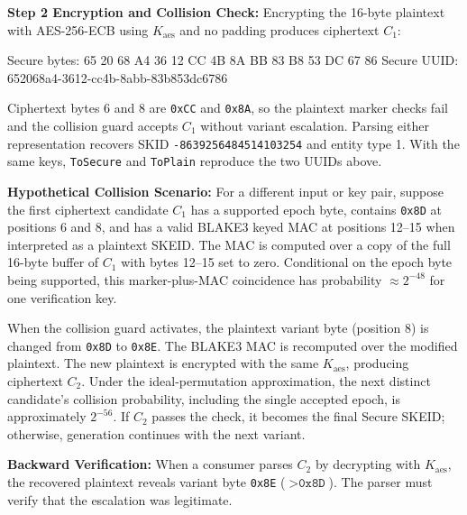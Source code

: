 \documentclass[fleqn,10pt]{wlpeerj}
\newenvironment{Shaded}{}{}
\newcommand{\NormalTok}[1]{#1}
\begin{document}
\textbf{Step 2 Encryption and Collision Check:} Encrypting the 16-byte
plaintext with AES-256-ECB using \(K_{\mathrm{aes}}\) and no padding
produces ciphertext \(C_1\):

\begin{Shaded}
\begin{Highlighting}[]
\NormalTok{Secure bytes: 65 20 68 A4 36 12 CC 4B 8A BB 83 B8 53 DC 67 86}
\NormalTok{Secure UUID:  652068a4{-}3612{-}cc4b{-}8abb{-}83b853dc6786}
\end{Highlighting}
\end{Shaded}

Ciphertext bytes 6 and 8 are \texttt{0xCC} and \texttt{0x8A}, so the
plaintext marker checks fail and the collision guard accepts \(C_1\)
without variant escalation. Parsing either representation recovers SKID
\texttt{-8639256484514103254} and entity type 1. With the same keys,
\texttt{ToSecure} and \texttt{ToPlain} reproduce the two UUIDs above.

\textbf{Hypothetical Collision Scenario:} For a different input or key
pair, suppose the first ciphertext candidate \(C_1\) has a supported
epoch byte, contains \texttt{0x8D} at positions 6 and 8, and has a valid
BLAKE3 keyed MAC at positions 12--15 when interpreted as a plaintext
SKEID. The MAC is computed over a copy of the full 16-byte buffer of
\(C_1\) with bytes 12--15 set to zero. Conditional on the epoch byte
being supported, this marker-plus-MAC coincidence has probability
\(\approx 2^{-48}\) for one verification key.

When the collision guard activates, the plaintext variant byte (position
8) is changed from \texttt{0x8D} to \texttt{0x8E}. The BLAKE3 MAC is
recomputed over the modified plaintext. The new plaintext is encrypted
with the same \(K_{\mathrm{aes}}\), producing ciphertext \(C_2\). Under
the ideal-permutation approximation, the next distinct candidate's
collision probability, including the single accepted epoch, is
approximately \(2^{-56}\). If \(C_2\) passes the check, it becomes the
final Secure SKEID; otherwise, generation continues with the next
variant.

\textbf{Backward Verification:} When a consumer parses \(C_2\) by
decrypting with \(K_{\mathrm{aes}}\), the recovered plaintext reveals
variant byte \texttt{0x8E} (\(> \texttt{0x8D}\)). The parser must verify
that the escalation was legitimate.
\end{document}
